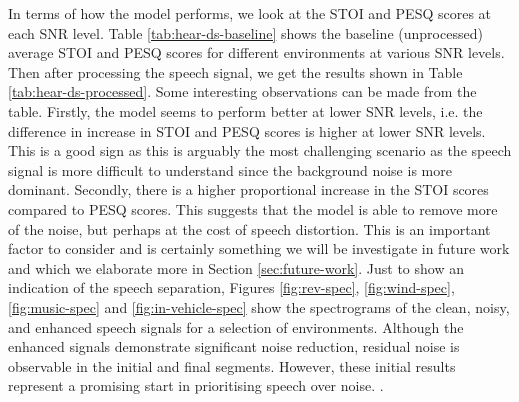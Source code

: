 \documentclass[logo,bsc,singlespacing,parskip,online]{infthesis}
\begin{document}
In terms of how the model performs, we look at the STOI and PESQ scores at each SNR level.
Table \ref{tab:hear-ds-baseline} shows the baseline (unprocessed) average STOI and PESQ scores for different environments at various SNR levels.
Then after processing the speech signal, we get the results shown in Table \ref{tab:hear-ds-processed}.
Some interesting observations can be made from the table. Firstly, the model 
seems to perform better at lower SNR levels, i.e. 
the difference in increase in STOI and PESQ scores is higher at lower SNR levels.
This is a good sign as this is arguably the most challenging scenario 
as the speech signal is more difficult to understand since the background noise 
is more dominant. Secondly, there is a higher proportional increase in the STOI 
scores compared to PESQ scores. This suggests that the model is able 
to remove more of the noise, but perhaps at the cost of speech distortion. 
This is an important factor to consider and is certainly something we 
will be investigate in future work and which we elaborate more in Section \ref{sec:future-work}.
Just to show an indication of the speech separation, Figures \ref{fig:rev-spec}, \ref{fig:wind-spec}, \ref{fig:music-spec} and \ref{fig:in-vehicle-spec}
show the spectrograms of the clean, noisy, and enhanced speech signals for a selection of environments.
Although the enhanced signals demonstrate significant noise reduction, residual noise is 
observable in the initial and final segments. However, these initial results 
represent a promising start in prioritising speech over noise.
.
\end{document}
